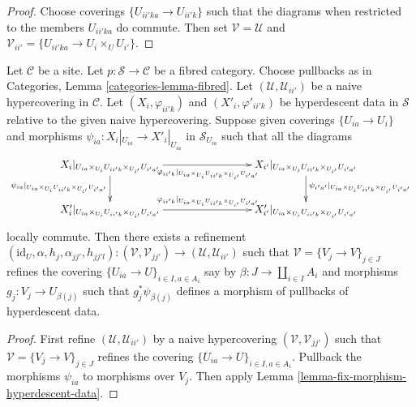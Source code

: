 \begin{proof}
Choose coverings $\{U_{ii'ka} \to U_{ii'k}\}$ such that the diagrams
when restricted to the members $U_{ii'ka}$ do commute. Then set
$\mathcal{V} = \mathcal{U}$ and
$\mathcal{V}_{ii'} = \{U_{ii'ka} \to U_i \times_U U_{i'}\}$.
\end{proof}

\begin{lemma}
\label{lemma-fix-morphism-hyperdescent-data-more}
Let $\mathcal{C}$ be a site.
Let $p : \mathcal{S} \to \mathcal{C}$ be a fibred category.
Choose pullbacks as in Categories, Lemma \ref{categories-lemma-fibred}.
Let
$(\mathcal{U}, \mathcal{U}_{ii'})$
be a naive hypercovering in $\mathcal{C}$.
Let $(X_i, \varphi_{ii'k})$ and $(X'_i, \varphi'_{ii'k})$
be hyperdescent data in $\mathcal{S}$
relative to the given naive hypercovering.
Suppose given coverings $\{U_{ia} \to U_i\}$
and morphisms
$\psi_{ia} : X_i|_{U_{ia}} \to X'_i|_{U_{ia}}$
in $\mathcal{S}_{U_{ia}}$ such that all the diagrams
$$
\xymatrix{
X_i|_{U_{ia} \times_{U_i} U_{ii'k} \times_{U_{i'}} U_{i'a'}}
\ar[rrr]_{\varphi_{ii'k}|_{U_{ia}\times_{U_i}U_{ii'k}\times_{U_{i'}}U_{i'a'}}}
\ar[d]_{\psi_{ia}|_{U_{ia}\times_{U_i}U_{ii'k}\times_{U_{i'}}U_{i'a'}}}
& & &
X_{i'}|_{U_{ia} \times_{U_i} U_{ii'k} \times_{U_{i'}} U_{i'a'}}
\ar[d]^{\psi_{i'a'}|_{U_{ia}\times_{U_i}U_{ii'k}\times_{U_{i'}}U_{i'a'}}}
\\
X'_i|_{U_{ia} \times_{U_i} U_{ii'k} \times_{U_{i'}} U_{i'a'}}
\ar[rrr]^{\varphi_{ii'k}|_{U_{ia}\times_{U_i}U_{ii'k}\times_{U_{i'}}U_{i'a'}}}
& & &
X'_{i'}|_{U_{ia} \times_{U_i} U_{ii'k} \times_{U_{i'}} U_{i'a'}}
}
$$
locally commute. Then there exists a refinement
$(\text{id}_U, \alpha, h_j, \alpha_{jj'}, h_{jj'l}) :
(\mathcal{V}, \mathcal{V}_{jj'}) \to (\mathcal{U}, \mathcal{U}_{ii'})$
such that $\mathcal{V} = \{V_j \to V\}_{j \in J}$ refines the covering
$\{U_{ia} \to U\}_{i\in I, a \in A_i}$ say by
$\beta : J \to \coprod_{i \in I} A_i$ and morphisms
$g_j : V_j \to U_{\beta(j)}$
such that $g_j^*\psi_{\beta(j)}$ defines a morphism of pullbacks
of hyperdescent data.
\end{lemma}

\begin{proof}
First refine $(\mathcal{U}, \mathcal{U}_{ii'})$ by a naive hypercovering
$(\mathcal{V}, \mathcal{V}_{jj'})$ such that
$\mathcal{V} = \{V_j \to V\}_{j \in J}$ refines the covering
$\{U_{ia} \to U\}_{i\in I, a \in A_i}$. Pullback the morphisms $\psi_{ia}$
to morphisms over $V_j$. Then apply
Lemma \ref{lemma-fix-morphism-hyperdescent-data}.
\end{proof}

